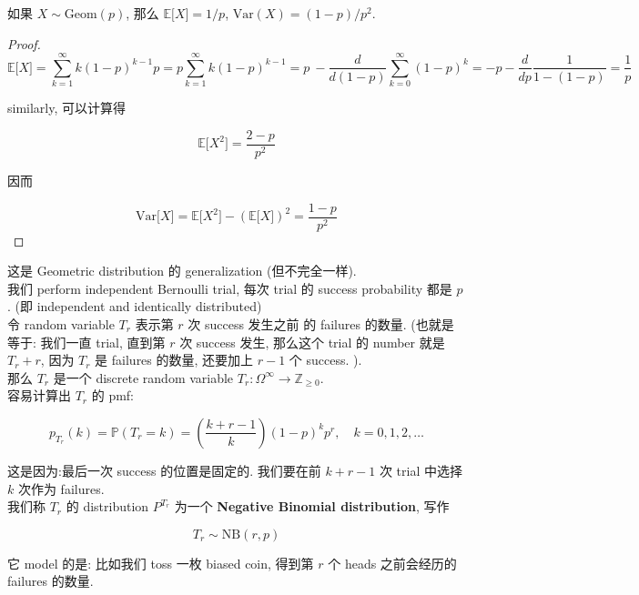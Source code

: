 \documentclass{qlnotes-export}
\begin{document}
\begin{proposition}\label{prop-02-random-variables-proposition-012}

如果 \(X \sim \text{Geom}(p)\), 那么 \({\mathbb{E}}\lbrack X\rbrack = 1/p\), \(\text{Var}(X) = (1 - p)/p^{2}\).

\end{proposition}

\begin{proof}

\[{\mathbb{E}}\lbrack X\rbrack = \sum\limits_{k = 1}^{\infty}k(1 - p)^{k - 1}p = p\sum\limits_{k = 1}^{\infty}k(1 - p)^{k - 1} = p\  - \frac{d}{d(1 - p)}\sum\limits_{k = 0}^{\infty}(1 - p)^{k} = - p - \frac{d}{dp}\frac{1}{1 - (1 - p)} = \frac{1}{p}\]

similarly, 可以计算得

\[{\mathbb{E}}\lbrack X^{2}\rbrack = \frac{2 - p}{p^{2}}\]

因而

\[\text{Var}\lbrack X\rbrack = {\mathbb{E}}\lbrack X^{2}\rbrack - ({\mathbb{E}}\lbrack X\rbrack)^{2} = \frac{1 - p}{p^{2}}\]

\end{proof}

\begin{example}\label{ex-02-random-variables-negative-binomial-distribution}

这是 Geometric distribution 的 generalization (但不完全一样).\\
我们 perform independent Bernoulli trial, 每次 trial 的 success probability 都是 \(p\). (即 independent and identically distributed)\\
令 random variable \(T_{r}\) 表示第 \(r\) 次 success 发生之前 的 failures 的数量. (也就是等于: 我们一直 trial, 直到第 \(r\) 次 success 发生, 那么这个 trial 的 number 就是 \(T_{r} + r\), 因为 \(T_{r}\) 是 failures 的数量, 还要加上 \(r - 1\) 个 success. ).\\
那么 \(T_{r}\) 是一个 discrete random variable \(T_{r}:\Omega^{\infty}\rightarrow{\mathbb{Z}}_{\geq 0}\).\\
容易计算出 \(T_{r}\) 的 pmf:

\[p_{T_{r}}(k) = {\mathbb{P}}(T_{r} = k) = \left( \frac{k + r - 1}{k} \right)(1 - p)^{k}p^{r},\quad k = 0,1,2,\ldots\]

这是因为:最后一次 success 的位置是固定的. 我们要在前 \(k + r - 1\) 次 trial 中选择 \(k\) 次作为 failures.\\
我们称 \(T_{r}\) 的 distribution \(P^{T_{r}}\) 为一个 \textbf{Negative Binomial distribution}, 写作

\[T_{r} \sim \text{NB}(r,p)\]

它 model 的是: 比如我们 toss 一枚 biased coin, 得到第 \(r\) 个 heads 之前会经历的 failures 的数量.\\

\end{example}
\end{document}
